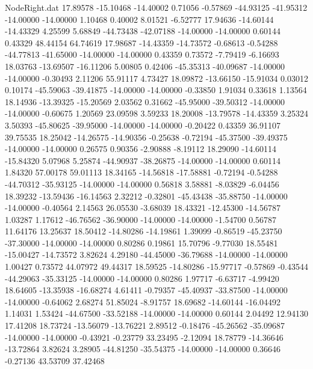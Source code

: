 \begin{filecontents}{NodeRight.dat}
  17.89578  -15.10468  -14.40002     0.71056   -0.57869  -44.93125  -41.95312  -14.00000  -14.00000    1.10468    0.40002    8.01521   -6.52777
  17.94636  -14.60144  -14.43329     4.25599    5.68849  -44.73438  -42.07188  -14.00000  -14.00000    0.60144    0.43329   48.44154   64.74619
  17.98687  -14.43359  -14.73572    -0.68613   -0.54288  -44.77813  -41.65000  -14.00000  -14.00000    0.43359    0.73572   -7.79419   -6.16693
  18.03763  -13.69507  -16.11206     5.00805    0.42406  -45.35313  -40.09687  -14.00000  -14.00000   -0.30493    2.11206   55.91117    4.73427
  18.09872  -13.66150  -15.91034     0.03012    0.10174  -45.59063  -39.41875  -14.00000  -14.00000   -0.33850    1.91034    0.33618    1.13564
  18.14936  -13.39325  -15.20569     2.03562    0.31662  -45.95000  -39.50312  -14.00000  -14.00000   -0.60675    1.20569   23.09598    3.59233
  18.20008  -13.79578  -14.43359     3.25324    3.50393  -45.80625  -39.95000  -14.00000  -14.00000   -0.20422    0.43359   36.91107   39.75535
  18.25042  -14.26575  -14.90356    -0.25638   -0.72194  -45.37500  -39.49375  -14.00000  -14.00000    0.26575    0.90356   -2.90888   -8.19112
  18.29090  -14.60114  -15.84320     5.07968    5.25874  -44.90937  -38.26875  -14.00000  -14.00000    0.60114    1.84320   57.00178   59.01113
  18.34165  -14.56818  -17.58881    -0.72194   -0.54288  -44.70312  -35.93125  -14.00000  -14.00000    0.56818    3.58881   -8.03829   -6.04456
  18.39232  -13.59436  -16.14563     2.32212   -0.32801  -45.43438  -35.88750  -14.00000  -14.00000   -0.40564    2.14563   26.05530   -3.68039
  18.43321  -12.45300  -14.56787     1.03287    1.17612  -46.76562  -36.90000  -14.00000  -14.00000   -1.54700    0.56787   11.64176   13.25637
  18.50412  -14.80286  -14.19861     1.39099   -0.86519  -45.23750  -37.30000  -14.00000  -14.00000    0.80286    0.19861   15.70796   -9.77030
  18.55481  -15.00427  -14.73572     3.82624    4.29180  -44.45000  -36.79688  -14.00000  -14.00000    1.00427    0.73572   44.07972   49.44317
  18.59525  -14.80286  -15.97717    -0.57869   -0.43544  -44.29063  -35.33125  -14.00000  -14.00000    0.80286    1.97717   -6.63717   -4.99420
  18.64605  -13.35938  -16.68274     4.61411   -0.79357  -45.40937  -33.87500  -14.00000  -14.00000   -0.64062    2.68274   51.85024   -8.91757
  18.69682  -14.60144  -16.04492     1.14031    1.53424  -44.67500  -33.52188  -14.00000  -14.00000    0.60144    2.04492   12.94130   17.41208
  18.73724  -13.56079  -13.76221     2.89512   -0.18476  -45.26562  -35.09687  -14.00000  -14.00000   -0.43921   -0.23779   33.23495   -2.12094
  18.78779  -14.36646  -13.72864     3.82624    3.28905  -44.81250  -35.54375  -14.00000  -14.00000    0.36646   -0.27136   43.53709   37.42468

\end{filecontents}
